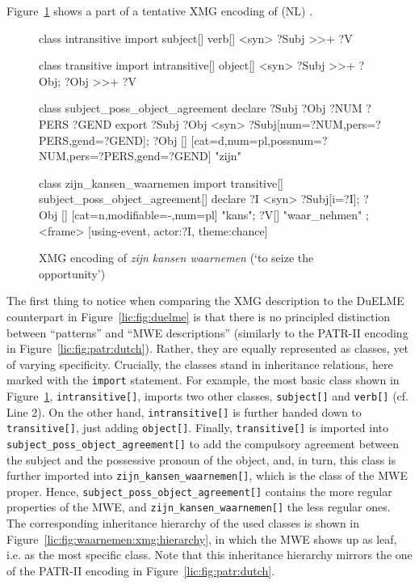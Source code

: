 \documentclass[output=paper]{langsci/langscibook}
\begin{document}
Figure~\ref{lic:fig:waarnemen:xmg} shows a part of a tentative XMG encoding of (NL) .%
\begin{figure}[h]
\begin{xmg}
class intransitive
import subject[] verb[]
{ <syn> { ?Subj >>+ ?V }}

class transitive
import intransitive[] object[]
{ <syn> { ?Subj >>+ ?Obj;
          ?Obj >>+ ?V } }

class subject_poss_object_agreement
declare ?Subj ?Obj ?NUM ?PERS ?GEND
export ?Subj ?Obj
{ <syn> {
    ?Subj[num=?NUM,pers=?PERS,gend=?GEND];
    ?Obj [] {
      [cat=d,num=pl,possnum=?NUM,pers=?PERS,gend=?GEND] "zijn"}}}

class zijn_kansen_waarnemen 
import transitive[] subject_poss_object_agreement[]
declare ?I
{ <syn> {
    ?Subj[i=?I];
    ?Obj [] {
      [cat=n,modifiable=-,num=pl] "kans"};
    ?V[] "waar_nehmen" };
  <frame> {
     [using-event,
      actor:?I,
      theme:chance]}}
\end{xmg}
  \caption{XMG encoding of \textit{zijn kansen waarnemen} (`to seize the opportunity')}
  \label{lic:fig:waarnemen:xmg}
\end{figure}
The first thing to notice when comparing the XMG description to the DuELME counterpart in Figure~\ref{lic:fig:duelme} is that there is no principled distinction between ``patterns'' and ``MWE descriptions'' (similarly to the PATR-II encoding in Figure~\ref{lic:fig:patr:dutch}). Rather, they are equally represented as classes, yet of varying specificity. Crucially, the classes stand in inheritance relations, here marked with the \texttt{import} statement. For example, the most basic class shown in Figure~\ref{lic:fig:waarnemen:xmg}, \texttt{intransitive[]}, imports two other classes, \texttt{subject[]} and \texttt{verb[]} (cf. Line 2). On the other hand, \texttt{intransitive[]} is further handed down to \texttt{transitive[]}, just adding \texttt{object[]}. Finally, \texttt{transitive[]} is imported into \texttt{subject\_poss\_object\_agreement[]} to add the compulsory agreement between the subject and the possessive pronoun of the object, and, in turn, this class is further imported into \texttt{zijn\_kansen\_waarnemen[]}, which is the class of the MWE proper. Hence, \texttt{subject\_poss\_object\_agreement[]} contains the more regular properties of the MWE, and \texttt{zijn\_kansen\_waarnemen[]} the less regular ones. The corresponding inheritance hierarchy of the used classes is shown in Figure~\ref{lic:fig:waarnemen:xmg:hierarchy}, in which the MWE shows up as leaf, i.e. as the most specific class. Note that this inheritance hierarchy mirrors the one of the PATR-II encoding in Figure~\ref{lic:fig:patr:dutch}. 
\end{document}
